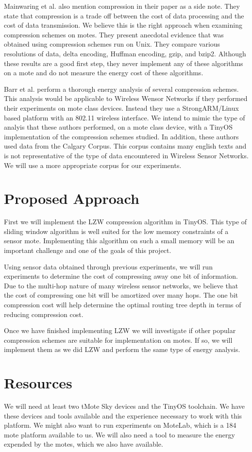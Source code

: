 \documentclass[10pt]{article}
\begin{document}
Mainwaring et al. \cite{habitat} also mention compression in their
paper as a side note. They state that compression is a trade off
between the cost of data processing and the cost of data
transmission. We believe this is the right approach when examining
compression schemes on motes. They present anecdotal evidence that was
obtained using compression schemes run on Unix. They compare various
resolutions of data, delta encoding, Huffman encoding, gzip, and
bzip2. Although these results are a good first step, they never
implement any of these algorithms on a mote and do not measure the
energy cost of these algorithms. 

Barr et al. \cite{energyaware} perform a thorough energy analysis of
several compression schemes. This analysis would be applicable to
Wireless Wensor Networks if they performed their experiments on mote
class devices. Instead they use a StrongARM/Linux based platform with
an 802.11 wireless interface. We intend to mimic the type of analyis
that these authors performed, on a mote class device, with a TinyOS
implementation of the compression schemes studied. In addition, these
authors used data from the Calgary Corpus. This corpus contains many
english texts and is not representative of the type of data
encountered in Wireless Sensor Networks. We will use a more
appropriate corpus for our experiments.

\section{Proposed Approach} 

First we will implement the LZW \cite{lzw} compression algorithm in
TinyOS. This type of sliding window algorithm is well suited for the
low memory constraints of a sensor mote. Implementing this algorithm
on such a small memory will be an important challenge and one of the
goals of this project.

Using sensor data obtained through previous experiments, we will run
experiments to determine the cost of compressing away one bit of
information. Due to the multi-hop nature of many wireless sensor
networks, we believe that the cost of compressing one bit will be
amortized over many hops. The one bit compression cost will help
determine the optimal routing tree depth in terms of reducing
compression cost. 

Once we have finished implementing LZW we will investigate if other
popular compression schemes are suitable for implementation on
motes. If so, we will implement them as we did LZW and perform the
same type of energy analysis. 

\section{Resources}

We will need at least two tMote Sky devices and the TinyOS
toolchain. We have these devices and tools available and the
experience necessary to work with this platform. We might also want to
run experiments on MoteLab, which is a 184 mote platform available to
us. We will also need a tool to measure the energy expended by the
motes, which we also have available. 



\end{document}
